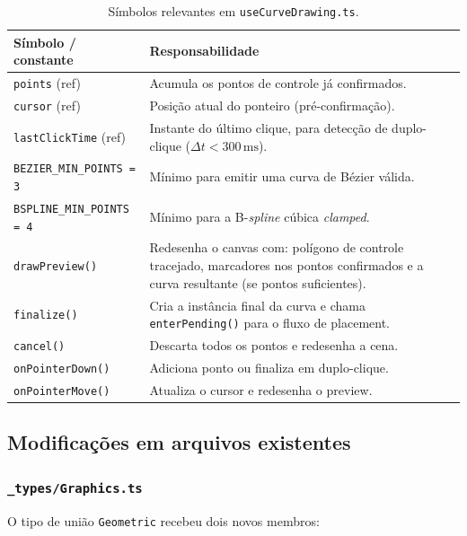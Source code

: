 \documentclass[12pt, a4paper]{article}
\theoremstyle{remark}
\newcommand{\file}[1]{\texttt{\small #1}}
\newcommand{\code}[1]{\texttt{#1}}
\begin{document}
\begin{table}[H]
\centering
\begin{tabular}{lp{9cm}}
\toprule
\textbf{Símbolo / constante} & \textbf{Responsabilidade} \\
\midrule
\code{points} (ref)               & Acumula os pontos de controle já confirmados. \\
\code{cursor} (ref)               & Posição atual do ponteiro (pré-confirmação). \\
\code{lastClickTime} (ref)        & Instante do último clique, para detecção de
                                    duplo-clique ($\Delta t < 300\,\text{ms}$). \\
\code{BEZIER\_MIN\_POINTS = 3}    & Mínimo para emitir uma curva de Bézier válida. \\
\code{BSPLINE\_MIN\_POINTS = 4}   & Mínimo para a B-\emph{spline} cúbica \emph{clamped}. \\
\code{drawPreview()}              & Redesenha o canvas com: polígono de controle
                                    tracejado, marcadores nos pontos confirmados e
                                    a curva resultante (se pontos suficientes). \\
\code{finalize()}                 & Cria a instância final da curva e chama
                                    \code{enterPending()} para o fluxo de placement. \\
\code{cancel()}                   & Descarta todos os pontos e redesenha a cena. \\
\code{onPointerDown()}            & Adiciona ponto ou finaliza em duplo-clique. \\
\code{onPointerMove()}            & Atualiza o cursor e redesenha o preview. \\
\bottomrule
\end{tabular}
\caption{Símbolos relevantes em \file{useCurveDrawing.ts}.}
\end{table}

\subsection{Modificações em arquivos existentes}

\subsubsection{\file{\_types/Graphics.ts}}

O tipo de união \code{Geometric} recebeu dois novos membros:
\end{document}
